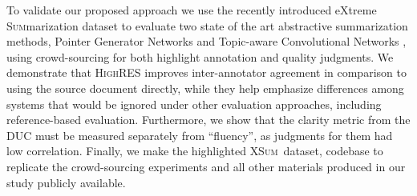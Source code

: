 \documentclass[11pt,a4paper]{article}
\newcommand\highres{\textsc{HighRES}}
\newcommand\ptgen{\textsc{PtGen}}
\newcommand\tconv{\textsc{TConvS2S}}
\newcommand\xsum{\textsc{XSum}}
\begin{document}

To validate our proposed approach we use the recently introduced e\textsc{X}treme \textsc{Sum}marization dataset \citep[\xsum,][]{narayan18xsum} to evaluate two state of the art abstractive summarization methods, Pointer Generator Networks \citep{See2017} and Topic-aware Convolutional Networks \citep{narayan18xsum}, using crowd-sourcing for both highlight annotation and quality judgments.
We demonstrate that \highres{} improves inter-annotator agreement in comparison to using the source document directly, while they help emphasize differences among systems that would be ignored under other evaluation approaches, including reference-based evaluation. Furthermore, we show that the clarity metric from the DUC \citep{dang2005overview} must be measured separately from ``fluency'', as judgments for them had low correlation. %
Finally, we make the highlighted \xsum\ dataset, codebase to replicate the crowd-sourcing experiments and all other materials produced in our study publicly available.


\end{document}
